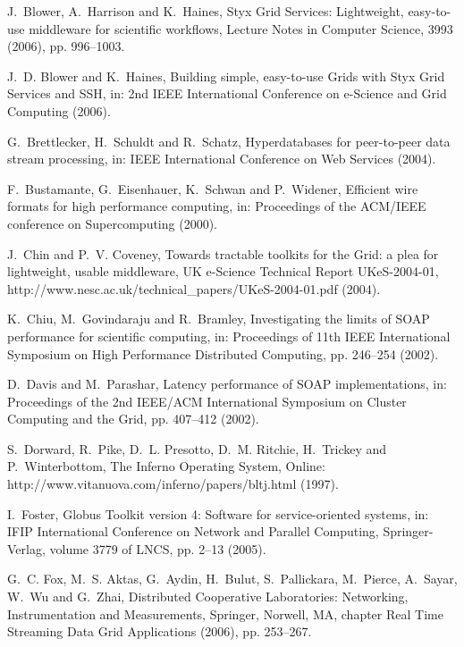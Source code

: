 \documentclass[a4paper]{article}
\begin{document}
\begin{thebibliography}{10}
J.~Blower, A.~Harrison and K.~Haines, {S}tyx {G}rid {S}ervices: Lightweight,
  easy-to-use middleware for scientific workflows, Lecture Notes in Computer
  Science, 3993 (2006), pp. 996--1003.

J.~D. Blower and K.~Haines, Building simple, easy-to-use {G}rids with {S}tyx
  {G}rid {S}ervices and {SSH}, in: 2nd IEEE International Conference on
  e-Science and Grid Computing (2006).

G.~Brettlecker, H.~Schuldt and R.~Schatz, Hyperdatabases for peer-to-peer data
  stream processing, in: IEEE International Conference on Web Services (2004).

F.~Bustamante, G.~Eisenhauer, K.~Schwan and P.~Widener, Efficient wire formats
  for high performance computing, in: Proceedings of the ACM/IEEE conference on
  Supercomputing (2000).

J.~Chin and P.~V. Coveney, Towards tractable toolkits for the {G}rid: a plea
  for lightweight, usable middleware, UK e-Science Technical Report
  UKeS-2004-01, http://www.nesc.ac.uk/technical\_papers/UKeS-2004-01.pdf
  (2004).

K.~Chiu, M.~Govindaraju and R.~Bramley, Investigating the limits of {SOAP}
  performance for scientific computing, in: Proceedings of 11th IEEE
  International Symposium on High Performance Distributed Computing, pp.
  246--254 (2002).

D.~Davis and M.~Parashar, Latency performance of {SOAP} implementations, in:
  Proceedings of the 2nd IEEE/ACM International Symposium on Cluster Computing
  and the Grid, pp. 407--412 (2002).

S.~Dorward, R.~Pike, D.~L. Presotto, D.~M. Ritchie, H.~Trickey and
  P.~Winterbottom, The {I}nferno {O}perating {S}ystem, Online:
  http://www.vitanuova.com/inferno/papers/bltj.html (1997).

I.~Foster, Globus {T}oolkit version 4: {S}oftware for service-oriented systems,
  in: IFIP International Conference on Network and Parallel Computing,
  Springer-Verlag, volume 3779 of LNCS, pp. 2--13 (2005).

G.~C. Fox, M.~S. Aktas, G.~Aydin, H.~Bulut, S.~Pallickara, M.~Pierce, A.~Sayar,
  W.~Wu and G.~Zhai, Distributed Cooperative Laboratories: Networking,
  Instrumentation and Measurements, Springer, Norwell, MA, chapter Real Time
  Streaming Data Grid Applications (2006), pp. 253--267.


\end{thebibliography}
\end{document}
